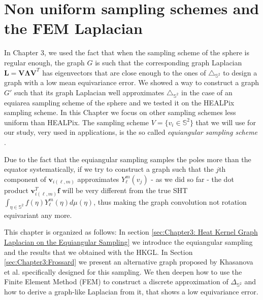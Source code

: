 

\section{Non uniform sampling schemes and the FEM Laplacian}

In Chapter 3, we used the fact that when the sampling scheme of the sphere is regular enough, the graph $G$ is such that the corresponding graph Laplacian $\mathbf {L=V\Lambda V}^T$ has eigenvectors that are close enough to the ones of $\triangle_{\mathbb S^2}$ to design a graph with a low mean equivariance error. We showed a way to construct a graph $G'$ such that its graph Laplacian well approximates $\triangle_{\mathbb S^2}$ in the case of an equiarea sampling scheme of the sphere and we tested it on the HEALPix sampling scheme. In this Chapter we focus on other sampling schemes less uniform than HEALPix. The sampling scheme $V=\{v_i\in \mathbb S^2\}$ that we will use for our study, very used in applications, is the so called \textit{equiangular sampling scheme} \cite{Driscoll:1994:CFT:184069.184073}. 

\begin{snugshade*}
	 Due to the fact that the equiangular sampling samples the poles more than the equator systematically, if we try to construct a graph such that the $j$th component of $\mathbf v_{i(\ell, m)}$ approximates $ Y_\ell^m(v_j)$ - as we did so far - the dot product $\mathbf v^T_{i(\ell, m)} \mathbf f$ will be very different from the true SHT $\int_{\eta \in \mathbb S^2}f(\eta)Y_\ell^m(\eta)d\mu(\eta)$, thus making the graph convolution not rotation equivariant any more.
\end{snugshade*} 


This chapter is organized as follows: In section \ref{sec:Chapter3: Heat Kernel Graph Laplacian on the Equiangular Sampling} we introduce the equiangular sampling and the results that we obtained with the HKGL. In Section \ref{sec:Chapter3:Frossard} we present an alternative graph proposed by Khasanova et al. \cite{Frossard2017GraphBasedCO} specifically designed for this sampling. We then deepen how to use the Finite Element Method (FEM) to construct a discrete approximation of $\Delta _{\mathbb S^2}$ and how to derive a graph-like Laplacian from it, that shows a low equivariance error.
